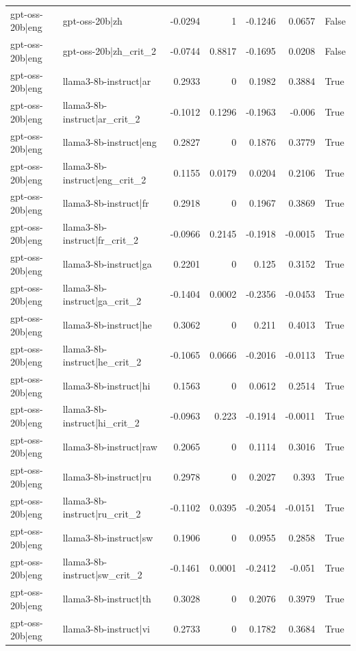\begin{table}
\begin{tabular}{l l r r r r l}
gpt-oss-20b|eng & gpt-oss-20b|zh & -0.0294 & 1 & -0.1246 & 0.0657 & False \\
gpt-oss-20b|eng & gpt-oss-20b|zh_crit_2 & -0.0744 & 0.8817 & -0.1695 & 0.0208 & False \\
gpt-oss-20b|eng & llama3-8b-instruct|ar & 0.2933 & 0 & 0.1982 & 0.3884 & True \\
gpt-oss-20b|eng & llama3-8b-instruct|ar_crit_2 & -0.1012 & 0.1296 & -0.1963 & -0.006 & True \\
gpt-oss-20b|eng & llama3-8b-instruct|eng & 0.2827 & 0 & 0.1876 & 0.3779 & True \\
gpt-oss-20b|eng & llama3-8b-instruct|eng_crit_2 & 0.1155 & 0.0179 & 0.0204 & 0.2106 & True \\
gpt-oss-20b|eng & llama3-8b-instruct|fr & 0.2918 & 0 & 0.1967 & 0.3869 & True \\
gpt-oss-20b|eng & llama3-8b-instruct|fr_crit_2 & -0.0966 & 0.2145 & -0.1918 & -0.0015 & True \\
gpt-oss-20b|eng & llama3-8b-instruct|ga & 0.2201 & 0 & 0.125 & 0.3152 & True \\
gpt-oss-20b|eng & llama3-8b-instruct|ga_crit_2 & -0.1404 & 0.0002 & -0.2356 & -0.0453 & True \\
gpt-oss-20b|eng & llama3-8b-instruct|he & 0.3062 & 0 & 0.211 & 0.4013 & True \\
gpt-oss-20b|eng & llama3-8b-instruct|he_crit_2 & -0.1065 & 0.0666 & -0.2016 & -0.0113 & True \\
gpt-oss-20b|eng & llama3-8b-instruct|hi & 0.1563 & 0 & 0.0612 & 0.2514 & True \\
gpt-oss-20b|eng & llama3-8b-instruct|hi_crit_2 & -0.0963 & 0.223 & -0.1914 & -0.0011 & True \\
gpt-oss-20b|eng & llama3-8b-instruct|raw & 0.2065 & 0 & 0.1114 & 0.3016 & True \\
gpt-oss-20b|eng & llama3-8b-instruct|ru & 0.2978 & 0 & 0.2027 & 0.393 & True \\
gpt-oss-20b|eng & llama3-8b-instruct|ru_crit_2 & -0.1102 & 0.0395 & -0.2054 & -0.0151 & True \\
gpt-oss-20b|eng & llama3-8b-instruct|sw & 0.1906 & 0 & 0.0955 & 0.2858 & True \\
gpt-oss-20b|eng & llama3-8b-instruct|sw_crit_2 & -0.1461 & 0.0001 & -0.2412 & -0.051 & True \\
gpt-oss-20b|eng & llama3-8b-instruct|th & 0.3028 & 0 & 0.2076 & 0.3979 & True \\
gpt-oss-20b|eng & llama3-8b-instruct|vi & 0.2733 & 0 & 0.1782 & 0.3684 & True \\

\end{tabular}
\end{table}
